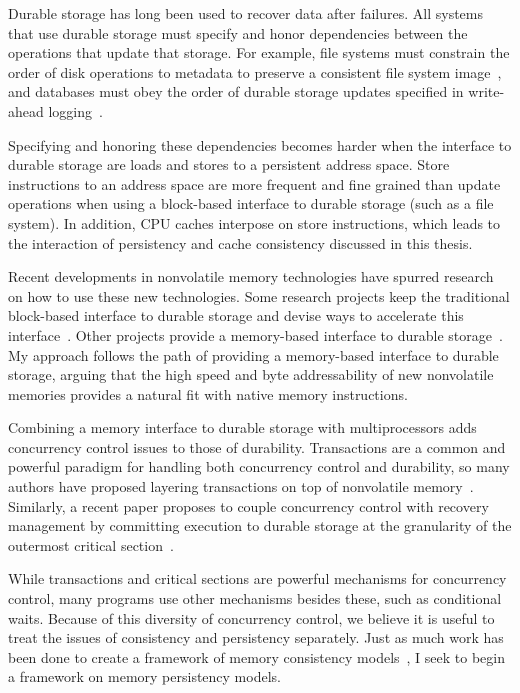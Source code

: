 Durable storage has long been used to recover data after failures.
All systems that use durable storage must specify and honor dependencies between the operations that update that storage.
For example, file systems must constrain the order of disk operations to metadata to preserve a consistent file system image~\cite{Ganger00,Chidambaram13}, and databases must obey the order of durable storage updates specified in write-ahead logging~\cite{MohanHaderle92}.

Specifying and honoring these dependencies becomes harder when the interface to durable storage are loads and stores to a persistent address space.
Store instructions to an address space are more frequent and fine grained than update operations when using a block-based interface to durable storage (such as a file system).
In addition, CPU caches interpose on store instructions, which leads to the interaction of persistency and cache consistency discussed in this thesis.

Recent developments in nonvolatile memory technologies have spurred research on how to use these new technologies.
Some research projects keep the traditional block-based interface to durable storage and devise ways to accelerate this interface~\cite{CaulfieldDe10}.
Other projects provide a memory-based interface to durable storage~\cite{CoburnCaulfield11}.
My approach follows the path of providing a memory-based interface to durable storage, arguing that the high speed and byte addressability of new nonvolatile memories provides a natural fit with native memory instructions.

Combining a memory interface to durable storage with multiprocessors adds concurrency control issues to those of durability.
Transactions are a common and powerful paradigm for handling both concurrency control and durability, so many authors have proposed layering transactions on top of nonvolatile memory~\cite{Lowell97,CoburnCaulfield11,VolosTack11,Coburn13}.
Similarly, a recent paper proposes to couple concurrency control with recovery management by committing execution to durable storage at the granularity of the outermost critical section~\cite{Chakrabarti13}.

While transactions and critical sections are powerful mechanisms for concurrency control, many programs use other mechanisms besides these, such as conditional waits.
Because of this diversity of concurrency control, we believe it is useful to treat the issues of consistency and persistency separately.
Just as much work has been done to create a framework of memory consistency models~\cite{Adve96}, I seek to begin a framework on memory persistency models.

